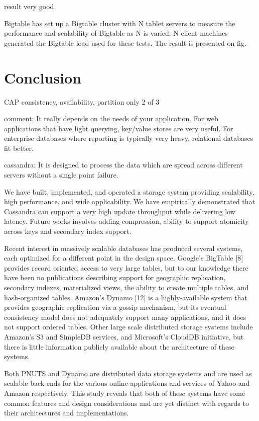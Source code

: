 \documentclass[12pt,letter]{article}
\begin{document}
result
very good

Bigtable has set up a Bigtable cluster with N tablet servers to measure the performance and scalability of Bigtable as N is varied. N client machines generated the Bigtable load used for these tests. The result is presented on fig. 

\section{Conclusion}
CAP consistency, availability, partition
only 2 of 3

comment:
It really depends on the needs of your application. For web applications that have light querying, key/value stores are very useful. For enterprise databases where reporting is typically very heavy, relational databases fit better. 

cassandra:
It is designed to process the data which are spread across different servers without a single point failure. 

We have built, implemented, and operated a storage system providing scalability, high performance, and wide applicability. We have empirically demonstrated that Cassandra can support a very high update throughput while delivering low latency. Future works involves adding compression, ability to support atomicity across keys and secondary index support.

Recent interest in massively scalable databases has produced several systems, each optimized for a different point in the design space. Google’s BigTable [8] provides record oriented access to very large tables, but to our knowledge there have been no publications describing support for geographic replication, secondary indexes, materialized views, the ability to create multiple tables, and hash-organized tables. Amazon’s Dynamo [12] is a highly-available system that provides geographic replication via a gossip mechanism, but its eventual consistency model does not adequately support many applications, and it does not support ordered tables. Other large scale distributed storage systems include Amazon’s S3 and SimpleDB services, and Microsoft’s CloudDB initiative, but there is little information publicly available about the architecture of these systems.

Both PNUTS and Dynamo are distributed data storage systems and are used as scalable back-ends for the various online applications and services of Yahoo and Amazon respectively. This study reveals that both of these systems have some common features and design considerations and are yet distinct with regards to their architectures and implementations.
\end{document}
